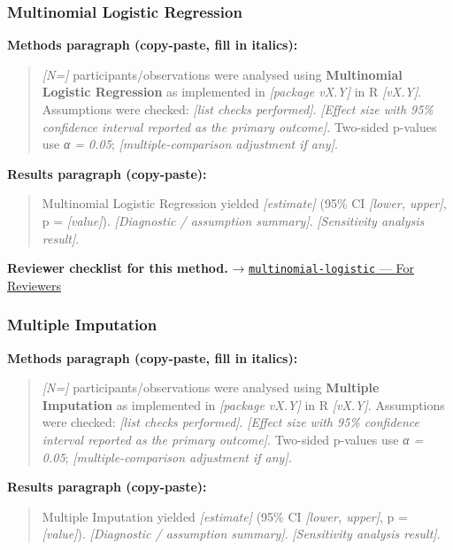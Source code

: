 \documentclass[
]{article}
\begin{document}
\subsubsection{Multinomial Logistic
Regression}\label{multinomial-logistic-regression}

\textbf{Methods paragraph (copy-paste, fill in italics):}

\begin{quote}
\emph{{[}N={]}} participants/observations were analysed using
\textbf{Multinomial Logistic Regression} as implemented in
\emph{{[}package vX.Y{]}} in R \emph{{[}vX.Y{]}}. Assumptions were
checked: \emph{{[}list checks performed{]}}. \emph{{[}Effect size with
95\% confidence interval reported as the primary outcome{]}}. Two-sided
p-values use \emph{α = 0.05}; \emph{{[}multiple-comparison adjustment if
any{]}}.
\end{quote}

\textbf{Results paragraph (copy-paste):}

\begin{quote}
Multinomial Logistic Regression yielded \emph{{[}estimate{]}} (95\% CI
\emph{{[}lower, upper{]}}, p = \emph{{[}value{]}}). \emph{{[}Diagnostic
/ assumption summary{]}}. \emph{{[}Sensitivity analysis result{]}}.
\end{quote}

\textbf{Reviewer checklist for this method.} →
\href{../chapters/07-regression/multinomial-logistic.Rmd\#for-reviewers}{\texttt{multinomial-logistic}
--- For Reviewers}

\subsubsection{Multiple Imputation}\label{multiple-imputation}

\textbf{Methods paragraph (copy-paste, fill in italics):}

\begin{quote}
\emph{{[}N={]}} participants/observations were analysed using
\textbf{Multiple Imputation} as implemented in \emph{{[}package vX.Y{]}}
in R \emph{{[}vX.Y{]}}. Assumptions were checked: \emph{{[}list checks
performed{]}}. \emph{{[}Effect size with 95\% confidence interval
reported as the primary outcome{]}}. Two-sided p-values use \emph{α =
0.05}; \emph{{[}multiple-comparison adjustment if any{]}}.
\end{quote}

\textbf{Results paragraph (copy-paste):}

\begin{quote}
Multiple Imputation yielded \emph{{[}estimate{]}} (95\% CI
\emph{{[}lower, upper{]}}, p = \emph{{[}value{]}}). \emph{{[}Diagnostic
/ assumption summary{]}}. \emph{{[}Sensitivity analysis result{]}}.
\end{quote}
\end{document}
